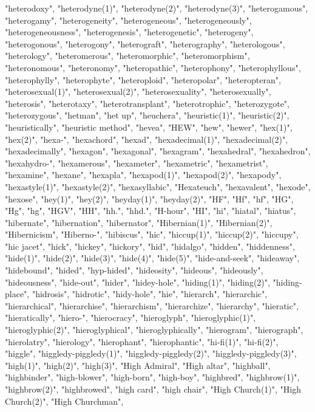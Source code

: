 "heterodoxy",
"heterodyne(1)",
"heterodyne(2)",
"heterodyne(3)",
"heterogamous",
"heterogamy",
"heterogeneity",
"heterogeneous",
"heterogeneously",
"heterogeneousness",
"heterogenesis",
"heterogenetic",
"heterogeny",
"heterogonous",
"heterogony",
"heterograft",
"heterography",
"heterologous",
"heterology",
"heteromerous",
"heteromorphic",
"heteromorphism",
"heteronomous",
"heteronomy",
"heteropathic",
"heterophony",
"heterophyllous",
"heterophylly",
"heterophyte",
"heteroploid",
"heteropolar",
"heteropteran",
"heterosexual(1)",
"heterosexual(2)",
"heterosexuality",
"heterosexually",
"heterosis",
"heterotaxy",
"heterotransplant",
"heterotrophic",
"heterozygote",
"heterozygous",
"hetman",
"het up",
"heuchera",
"heuristic(1)",
"heuristic(2)",
"heuristically",
"heuristic method",
"hevea",
"HEW",
"hew",
"hewer",
"hex(1)",
"hex(2)",
"hexa-",
"hexachord",
"hexad",
"hexadecimal(1)",
"hexadecimal(2)",
"hexadecimally",
"hexagon",
"hexagonal",
"hexagram",
"hexahedral",
"hexahedron",
"hexahydro-",
"hexamerous",
"hexameter",
"hexametric",
"hexametrist",
"hexamine",
"hexane",
"hexapla",
"hexapod(1)",
"hexapod(2)",
"hexapody",
"hexastyle(1)",
"hexastyle(2)",
"hexasyllabic",
"Hexateuch",
"hexavalent",
"hexode",
"hexose",
"hey(1)",
"hey(2)",
"heyday(1)",
"heyday(2)",
"HF",
"Hf",
"hf",
"HG",
"Hg",
"hg",
"HGV",
"HH",
"hh.",
"hhd.",
"H-hour",
"HI",
"hi",
"hiatal",
"hiatus",
"hibernate",
"hibernation",
"hibernator",
"Hibernian(1)",
"Hibernian(2)",
"Hibernicism",
"Hiberno-",
"hibiscus",
"hic",
"hiccup(1)",
"hiccup(2)",
"hiccupy",
"hic jacet",
"hick",
"hickey",
"hickory",
"hid",
"hidalgo",
"hidden",
"hiddenness",
"hide(1)",
"hide(2)",
"hide(3)",
"hide(4)",
"hide(5)",
"hide-and-seek",
"hideaway",
"hidebound",
"hided",
"hyp-hided",
"hideosity",
"hideous",
"hideously",
"hideousness",
"hide-out",
"hider",
"hidey-hole",
"hiding(1)",
"hiding(2)",
"hiding-place",
"hidrosis",
"hidrotic",
"hidy-hole",
"hie",
"hierarch",
"hierarchic",
"hierarchical",
"hierarchise",
"hierarchism",
"hierarchize",
"hierarchy",
"hieratic",
"hieratically",
"hiero-",
"hierocracy",
"hieroglyph",
"hieroglyphic(1)",
"hieroglyphic(2)",
"hieroglyphical",
"hieroglyphically",
"hierogram",
"hierograph",
"hierolatry",
"hierology",
"hierophant",
"hierophantic",
"hi-fi(1)",
"hi-fi(2)",
"higgle",
"higgledy-piggledy(1)",
"higgledy-piggledy(2)",
"higgledy-piggledy(3)",
"high(1)",
"high(2)",
"high(3)",
"High Admiral",
"High altar",
"highball",
"highbinder",
"high-blower",
"high-born",
"high-boy",
"highbred",
"highbrow(1)",
"highbrow(2)",
"highbrowed",
"high card",
"high chair",
"High Church(1)",
"High Church(2)",
"High Churchman",
